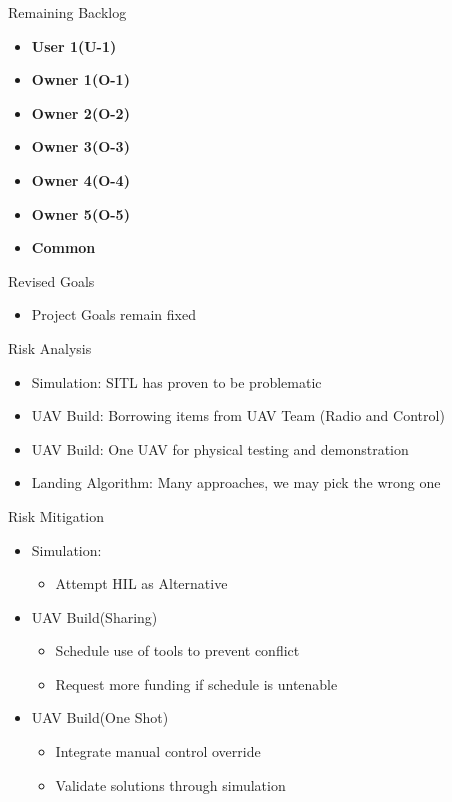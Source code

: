 \documentclass[11pt]{beamer}
\begin{document}
\begin{frame}{Remaining Backlog}
\begin{itemize}
\item \textbf{User 1(U-1)}
\item \textbf{Owner 1(O-1)}
\item \textbf{Owner 2(O-2)}
\item \textbf{Owner 3(O-3)}
\item \textbf{Owner 4(O-4)}
\item \textbf{Owner 5(O-5)}
\item \textbf{Common}
\end{itemize}

\end{frame}


\begin{frame}{Revised Goals}
	\begin{itemize}
		\item Project Goals remain fixed
	\end{itemize}

\end{frame}



\begin{frame}{Risk Analysis}
\begin{itemize}
\item Simulation: SITL has proven to be problematic
\item UAV Build: Borrowing items from UAV Team (Radio and Control)
\item UAV Build: One UAV for physical testing and demonstration
\item Landing Algorithm: Many approaches, we may pick the wrong one
\end{itemize}


\end{frame}

\begin{frame}{Risk Mitigation}
\begin{itemize}
\item Simulation:
\begin{itemize}
\item Attempt HIL as Alternative
\end{itemize}

\item UAV Build(Sharing)
\begin{itemize}
\item Schedule use of tools to prevent conflict
\item Request more funding if schedule is untenable
\end{itemize}

\item UAV Build(One Shot)
\begin{itemize}
\item Integrate manual control override
\item Validate solutions through simulation
\end{itemize}

\end{itemize}
\end{frame}
\end{document}
